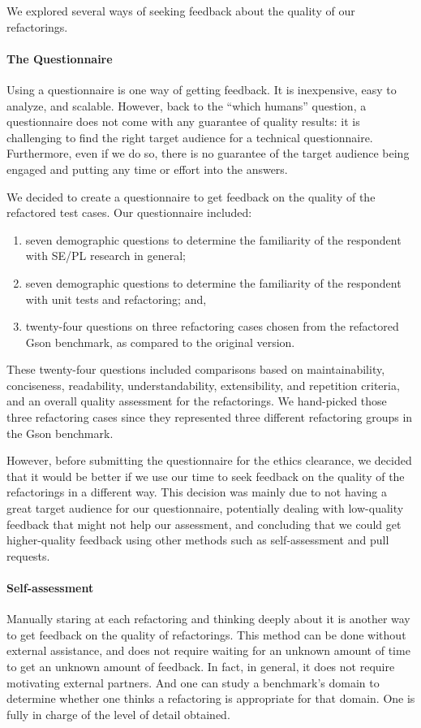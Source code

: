 We explored several ways of seeking feedback about the quality of our
refactorings.

\paragraph{The Questionnaire}
Using a questionnaire is one way of getting feedback. It is
inexpensive, easy to analyze, and scalable. However, back to the
``which humans'' question, a questionnaire does not come with any
guarantee of quality results: it is challenging to find the right
target audience for a technical questionnaire. Furthermore, even if we
do so, there is no guarantee of the target audience being
engaged and putting any time or effort into the answers.

We decided to create a questionnaire to get feedback on the quality of the refactored test cases. Our questionnaire included:

\begin{enumerate}
  \item seven demographic questions to determine the familiarity of the respondent with SE/PL research in general;
  \item seven demographic questions to determine the familiarity of the respondent with unit tests and refactoring; and,
  \item twenty-four questions on three refactoring cases chosen from the refactored Gson benchmark, as compared to the original version.
\end{enumerate}

These twenty-four questions included comparisons based on maintainability, conciseness, readability, understandability, extensibility, and repetition criteria, and an overall quality assessment for the refactorings.
We hand-picked those three refactoring cases since they represented three different refactoring groups in the Gson benchmark.

However, before submitting the questionnaire for the ethics clearance, we decided that it would be better if we use our time to seek feedback on the quality of the refactorings in a different way. This decision was mainly due to not having a great target audience for our questionnaire, potentially dealing with low-quality feedback that might not help our assessment, and concluding that we could get higher-quality feedback using other methods such as self-assessment and pull requests.

\paragraph{Self-assessment}
Manually staring at each refactoring and thinking deeply about it is another way to get feedback on the quality of refactorings. This method can be done without external assistance, and does not require waiting for an unknown amount of time to get an unknown amount of feedback. In fact, in general, it does not require motivating external partners. And one can study a benchmark's domain to determine whether one thinks a refactoring is appropriate for that domain. One is fully in charge of the level of detail obtained.

